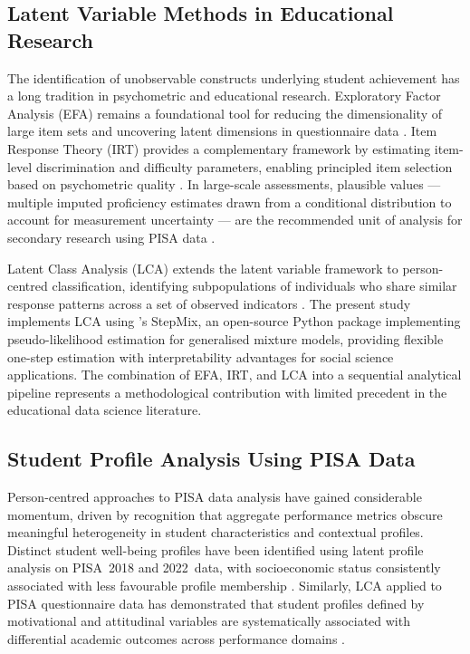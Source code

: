 \documentclass[twocolumn,12pt]{article}
\begin{document}
\subsection{Latent Variable Methods in Educational Research}

The identification of unobservable constructs underlying student achievement
has a long tradition in psychometric and educational research. Exploratory
Factor Analysis (EFA) remains a foundational tool for reducing the
dimensionality of large item sets and uncovering latent dimensions in
questionnaire data \parencite{fabrigar1999efa}. Item Response Theory (IRT)
provides a complementary framework by estimating item-level discrimination
and difficulty parameters, enabling principled item selection based on
psychometric quality \parencite{vanderlinden2016irt}. In large-scale
assessments, plausible values --- multiple imputed proficiency estimates
drawn from a conditional distribution to account for measurement uncertainty
--- are the recommended unit of analysis for secondary research using PISA
data \parencite{vondavier2009plausible}.

Latent Class Analysis (LCA) extends the latent variable framework to
person-centred classification, identifying subpopulations of individuals
who share similar response patterns across a set of observed indicators
\parencite{collins2010latent}. The present study implements LCA using
\textcite{morin2025stepmix}'s StepMix, an open-source Python package
implementing pseudo-likelihood estimation for generalised mixture models,
providing flexible one-step estimation with interpretability advantages for
social science applications. The combination of EFA, IRT, and LCA into a
sequential analytical pipeline represents a methodological contribution
with limited precedent in the educational data science literature.

\subsection{Student Profile Analysis Using PISA Data}

Person-centred approaches to PISA data analysis have gained considerable
momentum, driven by recognition that aggregate performance metrics obscure
meaningful heterogeneity in student characteristics and contextual profiles.
Distinct student well-being profiles have been identified using latent
profile analysis on PISA~2018 and 2022~data, with socioeconomic status
consistently associated with less favourable profile membership
\parencite{gorgun2024wellbeing}. Similarly, LCA applied to PISA
questionnaire data has demonstrated that student profiles defined by
motivational and attitudinal variables are systematically associated with
differential academic outcomes across performance domains
\parencite{yi2017lpa}.
\end{document}
